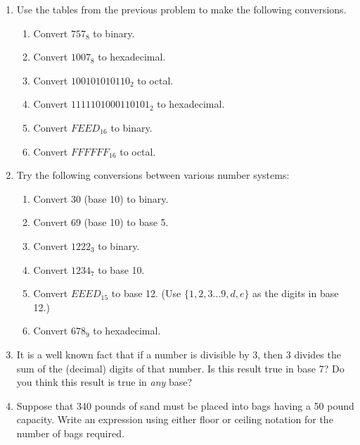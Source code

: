 \begin{enumerate}
{\vfill

}

\hintspagebreak
\workbookpagebreak
\textbookpagebreak

\item Use the tables from the previous problem to make the following conversions.

\begin{enumerate}
\item Convert $757_8$ to binary.
\item Convert $1007_8$ to hexadecimal.
\item Convert $100101010110_2$ to octal.
\item Convert $1111101000110101_2$ to hexadecimal.
\item Convert $FEED_{16}$ to binary.
\item Convert $FFFFFF_{16}$ to octal.
\end{enumerate}


\item Try the following conversions between various number systems:

\begin{enumerate}
\item Convert $30$ (base 10) to binary.
\item Convert $69$ (base 10) to base 5.
\item Convert $1222_3$ to binary.
\item Convert $1234_7$ to base 10.
\item Convert $EEED_{15}$ to base 12. (Use $\{1, 2, 3 \ldots 9, d, e\}$ as the digits in base 12.)
\item Convert $678_{9}$ to hexadecimal.
\end{enumerate}

\item It is a well known fact that if a number is divisible by 3, then 3
  divides the sum of the (decimal) digits of that number.  Is this
  result true in base 7?  Do you think this result is true in {\em
  any} base? 
 
 \wbvfill
 

\item Suppose that 340 pounds of sand must be placed into bags having
  a 50 pound capacity.  Write an expression using either floor or
  ceiling notation for the number of bags required.


\end{enumerate}
